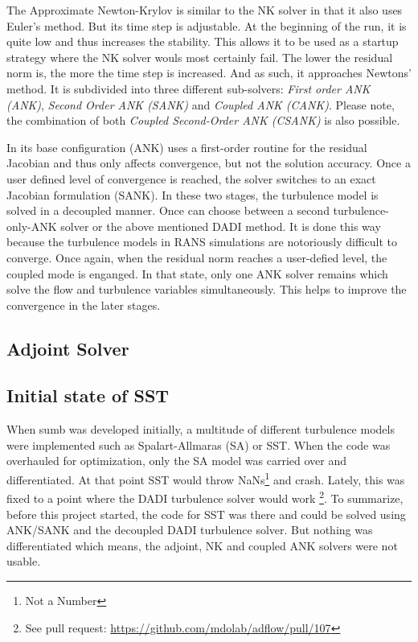 The Approximate Newton-Krylov is similar to the NK solver in that it also uses
Euler's method. But its time step is adjustable. At the beginning of the run,
it is quite low and thus increases the stability. This allows it to be used
as a startup strategy where the NK solver wouls most certainly fail. The
lower the residual norm is, the more the time step is increased. And as such, it
approaches Newtons' method. It is subdivided into three different sub-solvers:
\textit{First order ANK (ANK)}, \textit{Second Order ANK (SANK)} and
\textit{Coupled ANK (CANK)}. Please note, the combination of both
\textit{Coupled Second-Order ANK (CSANK)} is also possible.

In its base configuration (ANK) uses a first-order routine for the residual
Jacobian and thus only affects convergence, but not the solution accuracy. Once a user defined level of
convergence is reached, the solver switches to an exact Jacobian formulation
(SANK). In these two stages, the turbulence model is solved in a decoupled
manner. Once can choose between a second turbulence-only-ANK solver or the
above mentioned DADI method. It is done this way because the turbulence models
in RANS simulations are notoriously difficult to converge. Once again, when the
residual norm reaches a user-defied level, the coupled mode is enganged. In
that state, only one ANK solver remains which solve the flow and turbulence
variables simultaneously. This helps to improve the convergence in the later
stages. \cite{adflow_solvers}




\subsection{Adjoint Solver}




\subsection{Initial state of SST}
When sumb was developed initially, a multitude of different turbulence models
were implemented such as Spalart-Allmaras (SA) or SST. When the code was
overhauled for optimization, only the SA model was carried over and
differentiated. At that point SST would throw NaNs\footnote{Not a Number} and
crash. Lately, this was fixed to a point where the DADI turbulence solver would
work \footnote{See pull request:
\url{https://github.com/mdolab/adflow/pull/107}}. To summarize, before this
project started, the code for SST was there and could be solved using ANK/SANK
and the decoupled DADI turbulence solver. But nothing was differentiated which
means, the adjoint, NK and coupled ANK solvers were not usable.








